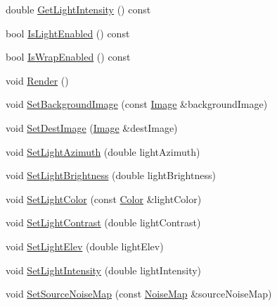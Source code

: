 \begin{DoxyCompactItemize}
\item 
double \hyperlink{classnoise_1_1utils_1_1_renderer_image_a17a7a45aa80c9b01ed3ed6a1c9fe0f26}{Get\+Light\+Intensity} () const 
\item 
bool \hyperlink{classnoise_1_1utils_1_1_renderer_image_aafdfe13e5ade3f63e4c111b00f14439b}{Is\+Light\+Enabled} () const 
\item 
bool \hyperlink{classnoise_1_1utils_1_1_renderer_image_ad629a8c6fb916a27be5d28a00aaaa66c}{Is\+Wrap\+Enabled} () const 
\item 
void \hyperlink{classnoise_1_1utils_1_1_renderer_image_af0da217faf032a6828a7d65c000108ad}{Render} ()
\item 
void \hyperlink{classnoise_1_1utils_1_1_renderer_image_a7807fd07a12617e404727944b7d42872}{Set\+Background\+Image} (const \hyperlink{classnoise_1_1utils_1_1_image}{Image} \&background\+Image)
\item 
void \hyperlink{classnoise_1_1utils_1_1_renderer_image_a0face58e643a3ee56bdcdead4910c933}{Set\+Dest\+Image} (\hyperlink{classnoise_1_1utils_1_1_image}{Image} \&dest\+Image)
\item 
void \hyperlink{classnoise_1_1utils_1_1_renderer_image_a3f60f115936df731eddca38bcc96b67c}{Set\+Light\+Azimuth} (double light\+Azimuth)
\item 
void \hyperlink{classnoise_1_1utils_1_1_renderer_image_a979417b8ec28b6408c8a0ed4f60aec16}{Set\+Light\+Brightness} (double light\+Brightness)
\item 
void \hyperlink{classnoise_1_1utils_1_1_renderer_image_a015f4b32365e6f62285b9f741d122b8d}{Set\+Light\+Color} (const \hyperlink{classnoise_1_1utils_1_1_color}{Color} \&light\+Color)
\item 
void \hyperlink{classnoise_1_1utils_1_1_renderer_image_a295ef7be9f61214533a661cb94e8820a}{Set\+Light\+Contrast} (double light\+Contrast)
\item 
void \hyperlink{classnoise_1_1utils_1_1_renderer_image_a6456ef5e27556480c71e3a6c899bff3b}{Set\+Light\+Elev} (double light\+Elev)
\item 
void \hyperlink{classnoise_1_1utils_1_1_renderer_image_ae4ca7c9d7b014a289f9f51a4c3365e78}{Set\+Light\+Intensity} (double light\+Intensity)
\item 
void \hyperlink{classnoise_1_1utils_1_1_renderer_image_ab6db6e2627deb4ea2b26e8fdff1794ca}{Set\+Source\+Noise\+Map} (const \hyperlink{classnoise_1_1utils_1_1_noise_map}{Noise\+Map} \&source\+Noise\+Map)
\end{DoxyCompactItemize}


